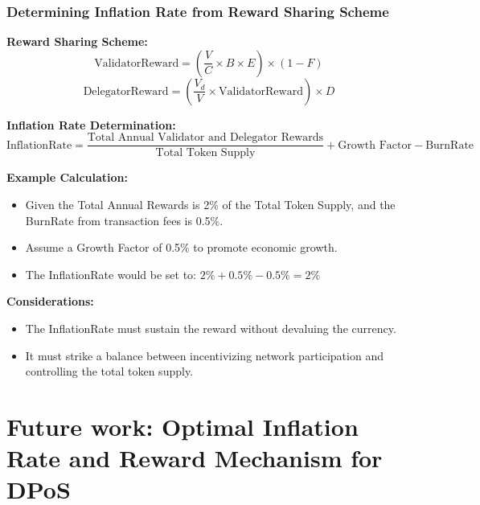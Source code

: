 \documentclass{beamer}
\begin{document}
\begin{frame}
\frametitle{Determining Inflation Rate from Reward Sharing Scheme }
\scriptsize
\textbf{Reward Sharing Scheme:}
\begin{equation}
\text{ValidatorReward} = \left( \frac{V}{C} \times B \times E \right) \times (1 - F)
\end{equation}
\begin{equation}
\text{DelegatorReward} = \left( \frac{V_d}{V} \times \text{ValidatorReward} \right) \times D
\end{equation}

\textbf{Inflation Rate Determination:}
\begin{equation}
\text{InflationRate} = \frac{\text{Total Annual Validator and Delegator Rewards}}{\text{Total Token Supply}} + \text{Growth Factor} - \text{BurnRate}
\end{equation}

\textbf{Example Calculation:}
\begin{itemize}
    \item Given the Total Annual Rewards is 2\% of the Total Token Supply, and the BurnRate from transaction fees is 0.5\%.
    \item Assume a Growth Factor of 0.5\% to promote economic growth.
    \item The InflationRate would be set to: \( 2\% + 0.5\% - 0.5\% = 2\% \)
\end{itemize}

\textbf{Considerations:}
\begin{itemize}
    \item The InflationRate must sustain the reward without devaluing the currency.
    \item It must strike a balance between incentivizing network participation and controlling the total token supply.
\end{itemize}

\end{frame}
\section{ Future work: Optimal Inflation Rate and Reward Mechanism for DPoS  }
\frame{\sectionpage}
\end{document}
